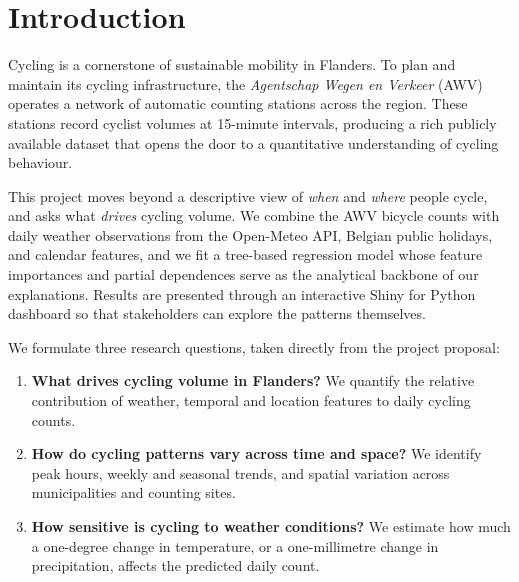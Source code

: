 \documentclass[11pt,a4paper]{article}
\begin{document}


\tableofcontents
\newpage

\setcounter{page}{1}

\section{Introduction}
\label{sec:intro}

Cycling is a cornerstone of sustainable mobility in Flanders. To plan and
maintain its cycling infrastructure, the \textit{Agentschap Wegen en
Verkeer} (AWV) operates a network of automatic counting stations across
the region. These stations record cyclist volumes at 15-minute
intervals, producing a rich publicly available dataset that opens the
door to a quantitative understanding of cycling behaviour.

This project moves beyond a descriptive view of \emph{when} and
\emph{where} people cycle, and asks what \emph{drives} cycling volume.
We combine the AWV bicycle counts with daily weather observations from
the Open-Meteo API, Belgian public holidays, and calendar features, and
we fit a tree-based regression model whose feature importances and
partial dependences serve as the analytical backbone of our
explanations. Results are presented through an interactive Shiny for
Python dashboard so that stakeholders can explore the patterns
themselves.

We formulate three research questions, taken directly from the project
proposal:

\begin{enumerate}[label=\textbf{RQ\arabic*.}, leftmargin=*]
  \item \textbf{What drives cycling volume in Flanders?} We quantify the
  relative contribution of weather, temporal and location features to
  daily cycling counts.
  \item \textbf{How do cycling patterns vary across time and space?} We
  identify peak hours, weekly and seasonal trends, and spatial variation
  across municipalities and counting sites.
  \item \textbf{How sensitive is cycling to weather conditions?} We
  estimate how much a one-degree change in temperature, or a
  one-millimetre change in precipitation, affects the predicted daily
  count.
\end{enumerate}
\end{document}
